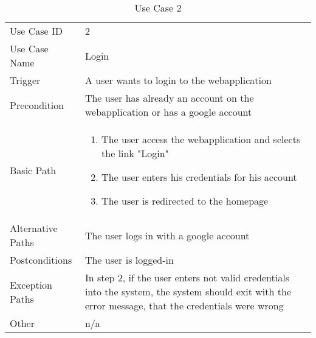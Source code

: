\begin{table}[H]
\centering
\label{table-use-case-2}
\begin{tabular}{|p{3cm}|p{10cm}}
Use Case ID       & 2                                                                                                                                                              \\
Use Case Name     & Login                                                                                                                                                          \\
Trigger           & A user wants to login to the webapplication                                                                                                                   \\
Precondition      & The user has already an account on the webapplication or has a google account                                                                                                          \\
Basic Path        & \begin{enumerate}
\item The user access the webapplication and selects the link "Login"
\item The user enters his credentials for his account
\item The user is redirected to the homepage
\end{enumerate} 
     \\
Alternative Paths & The user logs in with a google account                         \\
Postconditions    & The user is logged-in                                                                                                                                          \\
Exception Paths   & In step 2, if the user enters not valid credentials into the system, the system should exit with the error message, that the credentials were wrong            \\
Other             & n/a                                                                                                                                                                                                        
\end{tabular}
\caption{Use Case 2}
\end{table}


